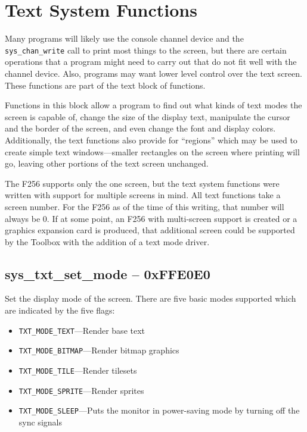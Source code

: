 \section{Text System Functions}
Many programs will likely use the console channel device and the \verb+sys_chan_write+ call to print most things to the screen,
but there are certain operations that a program might need to carry out that do not fit well with the channel device. Also,
programs may want lower level control over the text screen. These functions are part of the text block of functions.

Functions in this block allow a program to find out what kinds of text modes the screen is capable of, change the
size of the display text, manipulate the cursor and the border of the screen, and even change the font and display colors.
Additionally, the text functions also provide for ``regions'' which may be used to create simple text windows---smaller rectangles
on the screen where printing will go, leaving other portions of the text screen unchanged.

The F256 supports only the one screen, but the text system functions were written with support for multiple screens in mind.
All text functions take a screen number. For the F256 as of the time of this writing, that number will always be 0.
If at some point, an F256 with multi-screen support is created or a graphics expansion card is produced, that additional
screen could be supported by the Toolbox with the addition of a text mode driver.


\subsection*{sys\_txt\_set\_mode -- 0xFFE0E0}
Set the display mode of the screen. There are five basic modes supported which are indicated by the five flags:
\begin{itemize}
    \item \verb+TXT_MODE_TEXT+---Render base text
    \item \verb+TXT_MODE_BITMAP+---Render bitmap graphics
    \item \verb+TXT_MODE_TILE+---Render tilesets
    \item \verb+TXT_MODE_SPRITE+---Render sprites
    \item \verb+TXT_MODE_SLEEP+---Puts the monitor in power-saving mode by turning off the sync signals
\end{itemize}


